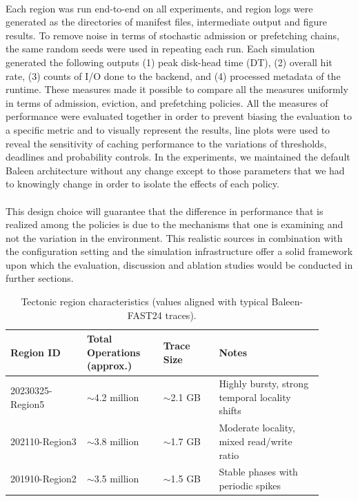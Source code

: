 \documentclass[sigconf]{acmart}
\begin{document}
{\\Each region was run end-to-end on all experiments, and region logs were generated as the directories of manifest files, intermediate output and figure results. To remove noise in terms of stochastic admission or prefetching chains, the same random seeds were used in repeating each run. Each simulation generated the following outputs (1) peak disk-head time (DT), (2) overall hit rate, (3) counts of I/O done to the backend, and (4) processed metadata of the runtime. These measures made it possible to compare all the measures uniformly in terms of admission, eviction, and prefetching policies. All the measures of performance were evaluated together in order to prevent biasing the evaluation to a specific metric and to visually represent the results, line plots were used to reveal the sensitivity of caching performance to the variations of thresholds, deadlines and probability controls. In the experiments, we maintained the default Baleen architecture without any change except to those parameters that we had to knowingly change in order to isolate the effects of each policy.\\
\\This design choice will guarantee that the difference in performance that is realized among the policies is due to the mechanisms that one is examining and not the variation in the environment. This realistic sources in combination with the configuration setting and the simulation infrastructure offer a solid framework upon which the evaluation, discussion and ablation studies would be conducted in further sections.\\

\begin{table}[H]
\small
\caption{Tectonic region characteristics (values aligned with typical Baleen-FAST24 traces).}
\label{tab:regions}
\centering
{}
\begin{tabular}{
  p{0.22\linewidth}
  p{0.22\linewidth}
  p{0.16\linewidth}
  p{0.30\linewidth}}
\toprule
\rowcolor{gray!25}
\textbf{Region ID} &
\textbf{Total Operations (approx.)} &
\textbf{Trace Size} &
\textbf{Notes} \\
\midrule
20230325-Region5 & $\sim$4.2 million & $\sim$2.1 GB &
Highly bursty, strong temporal locality shifts \\
202110-Region3   & $\sim$3.8 million & $\sim$1.7 GB &
Moderate locality, mixed read/write ratio \\
201910-Region2   & $\sim$3.5 million & $\sim$1.5 GB &
Stable phases with periodic spikes \\
\bottomrule
\end{tabular}
\end{table}


}
\end{document}
